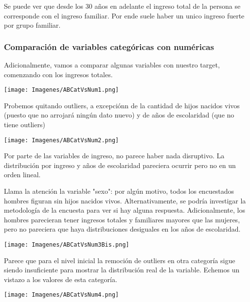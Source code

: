 \documentclass[a4paper]{article}
\begin{document}
            Se puede ver que desde los 30 años en adelante el ingreso total de la persona se corresponde con el ingreso familiar. Por ende suele haber un unico ingreso fuerte por grupo familiar.

        \subsubsection{Comparación de variables categóricas con numéricas}

            Adicionalmente, vamos a comparar algunas variables con nuestro target, comenzando con los ingresos totales.

            \begin{center}
                \texttt{[image: Imagenes/ABCatVsNum1.png]}
            \end{center}

            Probemos quitando outliers, a excepciónn de la cantidad de hijos nacidos vivos (puesto que no arrojará ningún dato nuevo) y de años de escolaridad (que no tiene outliers)

            \begin{center}
                \texttt{[image: Imagenes/ABCatVsNum2.png]}
            \end{center}

            Por parte de las variables de ingreso, no parece haber nada disruptivo. La distribución por ingreso y años de escolaridad pareciera ocurrir pero no en un orden lineal.

            Llama la atención la variable "sexo": por algún motivo, todos los encuestados hombres figuran sin hijos nacidos vivos. Alternativamente, se podría investigar la metodología de la encuesta para ver si hay alguna respuesta. Adicionalmente, los hombres parecieran tener ingresos totales y familiares mayores que las mujeres, pero no pareciera que haya distribuciones desiguales en los años de escolaridad.

            \begin{center}
                \texttt{[image: Imagenes/ABCatVsNum3Bis.png]}
            \end{center}

            Parece que para el nivel inicial la remoción de outliers en otra categoría sigue siendo insuficiente para mostrar la distribución real de la variable. Echemos un vistazo a los valores de esta categoría.

            \begin{center}
                \texttt{[image: Imagenes/ABCatVsNum4.png]}
            \end{center}
\end{document}
